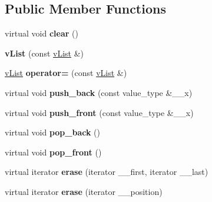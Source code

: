 \subsection*{Public Member Functions}
\begin{DoxyCompactItemize}
\item 
\hypertarget{classemorph_1_1vList_a30ccf7b28fd833223be29fd8c4141a5c}{virtual void {\bfseries clear} ()}\label{classemorph_1_1vList_a30ccf7b28fd833223be29fd8c4141a5c}

\item 
\hypertarget{classemorph_1_1vList_a387a1a701abd1a12c7a7e38446c34a58}{{\bfseries v\-List} (const \hyperlink{classemorph_1_1vList}{v\-List} \&)}\label{classemorph_1_1vList_a387a1a701abd1a12c7a7e38446c34a58}

\item 
\hypertarget{classemorph_1_1vList_a8d4170f034fbe501ed1e032b3d9ab80f}{\hyperlink{classemorph_1_1vList}{v\-List} {\bfseries operator=} (const \hyperlink{classemorph_1_1vList}{v\-List} \&)}\label{classemorph_1_1vList_a8d4170f034fbe501ed1e032b3d9ab80f}

\item 
\hypertarget{classemorph_1_1vList_a52fa114fb28dcd4bb3bec3d266aec66b}{virtual void {\bfseries push\-\_\-back} (const value\-\_\-type \&\-\_\-\-\_\-x)}\label{classemorph_1_1vList_a52fa114fb28dcd4bb3bec3d266aec66b}

\item 
\hypertarget{classemorph_1_1vList_a8e017ff03a72a8c7740a42578df04285}{virtual void {\bfseries push\-\_\-front} (const value\-\_\-type \&\-\_\-\-\_\-x)}\label{classemorph_1_1vList_a8e017ff03a72a8c7740a42578df04285}

\item 
\hypertarget{classemorph_1_1vList_a3e36835d457416bbce0adbe2c39647d7}{virtual void {\bfseries pop\-\_\-back} ()}\label{classemorph_1_1vList_a3e36835d457416bbce0adbe2c39647d7}

\item 
\hypertarget{classemorph_1_1vList_af04940a00e901d7c71395106100954f3}{virtual void {\bfseries pop\-\_\-front} ()}\label{classemorph_1_1vList_af04940a00e901d7c71395106100954f3}

\item 
\hypertarget{classemorph_1_1vList_aba71df6623373b0fbfd531db15ebafa2}{virtual iterator {\bfseries erase} (iterator \-\_\-\-\_\-first, iterator \-\_\-\-\_\-last)}\label{classemorph_1_1vList_aba71df6623373b0fbfd531db15ebafa2}

\item 
\hypertarget{classemorph_1_1vList_a47c6d242600118359c7f3c7adfd434e7}{virtual iterator {\bfseries erase} (iterator \-\_\-\-\_\-position)}\label{classemorph_1_1vList_a47c6d242600118359c7f3c7adfd434e7}


\end{DoxyCompactItemize}
